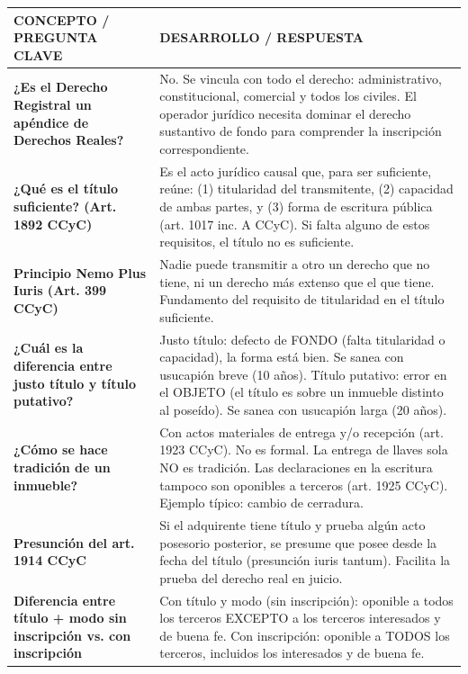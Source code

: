 \documentclass[11pt]{article}
\begin{document}
\renewcommand{\arraystretch}{1.18}
\small
\begin{longtable}{|>{\raggedright\arraybackslash}p{}|>{\raggedright\arraybackslash}p{}|}
\hline
\rowcolor{navy}
\color{white}\bfseries CONCEPTO / PREGUNTA CLAVE &
\color{white}\bfseries DESARROLLO / RESPUESTA\\ \hline
\rowcolor{lightblue}
\textbf{¿Es el Derecho Registral un apéndice de Derechos Reales?} &
No. Se vincula con todo el derecho: administrativo, constitucional, comercial y todos los civiles. El operador jurídico necesita dominar el derecho sustantivo de fondo para comprender la inscripción correspondiente.\\ \hline
\rowcolor{graybox}
\textbf{¿Qué es el título suficiente? (Art. 1892 CCyC)} &
Es el acto jurídico causal que, para ser suficiente, reúne: (1) titularidad del transmitente, (2) capacidad de ambas partes, y (3) forma de escritura pública (art. 1017 inc. A CCyC). Si falta alguno de estos requisitos, el título no es suficiente.\\ \hline
\rowcolor{lightblue}
\textbf{Principio Nemo Plus Iuris (Art. 399 CCyC)} &
Nadie puede transmitir a otro un derecho que no tiene, ni un derecho más extenso que el que tiene. Fundamento del requisito de titularidad en el título suficiente.\\ \hline
\rowcolor{graybox}
\textbf{¿Cuál es la diferencia entre justo título y título putativo?} &
Justo título: defecto de FONDO (falta titularidad o capacidad), la forma está bien. Se sanea con usucapión breve (10 años). Título putativo: error en el OBJETO (el título es sobre un inmueble distinto al poseído). Se sanea con usucapión larga (20 años).\\ \hline
\rowcolor{lightblue}
\textbf{¿Cómo se hace tradición de un inmueble?} &
Con actos materiales de entrega y/o recepción (art. 1923 CCyC). No es formal. La entrega de llaves sola NO es tradición. Las declaraciones en la escritura tampoco son oponibles a terceros (art. 1925 CCyC). Ejemplo típico: cambio de cerradura.\\ \hline
\rowcolor{graybox}
\textbf{Presunción del art. 1914 CCyC} &
Si el adquirente tiene título y prueba algún acto posesorio posterior, se presume que posee desde la fecha del título (presunción iuris tantum). Facilita la prueba del derecho real en juicio.\\ \hline
\rowcolor{lightblue}
\textbf{Diferencia entre título + modo sin inscripción vs. con inscripción} &
Con título y modo (sin inscripción): oponible a todos los terceros EXCEPTO a los terceros interesados y de buena fe. Con inscripción: oponible a TODOS los terceros, incluidos los interesados y de buena fe.\\ \hline

\end{longtable}
\end{document}

